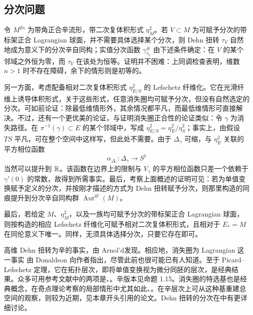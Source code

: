 \subsection{分次问题}\label{sec:16f}
令 $M^{2n}$ 为带角正合辛流形，带二次复体积形式 $\eta_M^2$。若 $V\subset M$ 为可赋予分次的带标架正合 Lagrangian 球面，并不需要具体选择某个分次，则 Dehn 扭转 $\tau_V$ 自然地成为意义下的分次辛自同构；实值分次函数 $\gamma_{\tau_V}^\#$ 由下述条件确定：在 $V$ 的某个邻域之外恒为零，而 $\tau_V$ 在该处为恒等。证明并不困难：上同调检查表明，维数 $n>1$ 时不存在障碍，余下的情形则是初等的。

另一方面，考虑配备相对二次复体积形式 $\eta_{E/S}^2$ 的 Lefschetz 纤维化。它在光滑纤维上诱导体积形式，关于这些形式，任意消失圈均可赋予分次，但没有自然选定的分次。可如前论证：除最低维情形外，其余情况都平凡，而最低维情形可直接解决。不过，还有一个更优美的论证，与证明消失圈正合性的论证类似：令 $\gamma$ 为消失路径。在 $\pi^{-1}(\gamma)\subset E$ 的某个邻域中，写成 $\eta_{E/S}^2=\eta_E^2/\eta_S^2$；事实上，由假设 $TS$ 平凡，可在整个空间中这样写，但此处不需要。由于 $\Delta_\gamma$ 可缩，与 $\eta_E^2$ 关联的平方相位函数
\[
\alpha_{\Delta_\gamma}:\Delta_\gamma\longrightarrow S^1
\]
当然可以提升到 $\mathbb R$。该函数在边界上的限制与 $V_\gamma$ 的平方相位函数只差一个依赖于 $\gamma'(0)$ 的常数，故得到所需事实。最后，考察上面概述的证明可见：若为单值变换赋予定义的分次，并按刚才描述的方式为 Dehn 扭转赋予分次，则那里构造的同痕提升到分次辛自同构群 $\operatorname{Aut}^{\mathrm{gr}}(M)$。

最后，若给定 $M$、$\eta_M^2$，以及一族均可赋予分次的带标架正合 Lagrangian 球面，则按构造的相应 Lefschetz 纤维化可赋予相对二次复体积形式，且相对于 $E_*=M$ 在同伦意义下唯一。同样，无须具体选择分次，只要它存在即可。

\begin{note}\label{st:16.10}
高维 Dehn 扭转为辛的事实，由 Arnol'd发现。相应地，消失圈为 Lagrangian 这一事实
由 Donaldson 向作者指出，尽管此前也很可能已有人知道。至于 Picard–Lefschetz 定理，它在拓扑层次，即将单值变换视为微分同胚的层次，是经典结果。众多可用参考文献中的两项是、。辛版本见命题 1.15。消失圈的特选基也是经典概念，在奇点理论考察的局部情形中尤其如此、。在辛层次上可从这种基重建总空间的观察，则较为近期，见本章开头引用的论文。Dehn 扭转的分次在中有更详细讨论。
\end{note}
